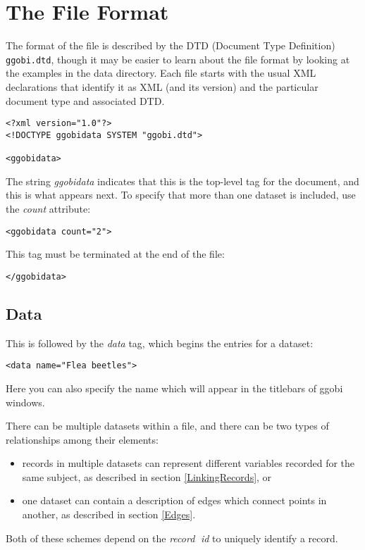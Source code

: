 \documentclass{article}
\def\XMLTag#1{\textit{#1}}
\def\XMLAttribute#1{\textsl{#1}}
\def\XMLElement#1{\XMLTag{#1}}
\begin{document}
\section{The File Format}

The format of the file is described by the DTD (Document Type
Definition) \texttt{ggobi.dtd}, though it may be easier to learn about
the file format by looking at the examples in the data directory.
Each file starts with the usual XML declarations that identify it as
XML (and its version) and the particular document type and associated
DTD.


\begin{verbatim}
<?xml version="1.0"?>
<!DOCTYPE ggobidata SYSTEM "ggobi.dtd">

<ggobidata>
\end{verbatim}
%
The string \XMLElement{ggobidata} indicates that this is the top-level
tag for the document, and this is what appears next.  To specify that
more than one dataset is included, use the \XMLAttribute{count}
attribute:
%
\begin{verbatim}
<ggobidata count="2">
\end{verbatim}
%
This tag must be terminated at the end of the file:
\begin{verbatim}
</ggobidata>
\end{verbatim}

\subsection{Data}

This is followed by the \XMLAttribute{data} tag, which begins the
entries for a dataset:

\begin{verbatim}
<data name="Flea beetles">
\end{verbatim}
%
Here you can also specify the name which will appear in the titlebars
of ggobi windows.

There can be multiple datasets within a file, and there can be two
types of relationships among their elements: 
\begin{itemize}
\item records in multiple datasets can represent different variables
  recorded for the same subject, as described in section
  \ref{LinkingRecords}, or
\item one dataset can contain a description of edges which connect
  points in another, as described in section \ref{Edges}.
\end{itemize}
Both of these schemes depend on the \XMLElement{record} \XMLAttribute{id} to
uniquely identify a record.
\end{document}
